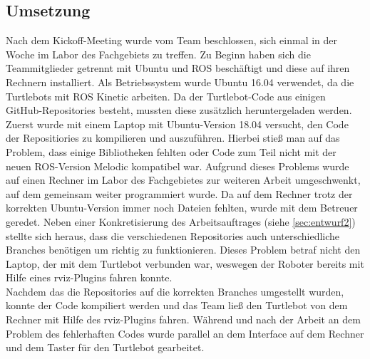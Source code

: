 \documentclass[a4paper,12pt,headsepline]{scrartcl}
\begin{document}
		
	\subsection{Umsetzung}
		Nach dem Kickoff-Meeting wurde vom Team beschlossen, sich einmal in der Woche im Labor des Fachgebiets zu treffen. Zu Beginn haben sich die Teammitglieder getrennt mit Ubuntu und ROS beschäftigt und diese auf ihren Rechnern installiert. Als Betriebssystem wurde Ubuntu 16.04 verwendet, da die Turtlebots mit ROS Kinetic arbeiten. Da der Turtlebot-Code aus einigen GitHub-Repositories besteht, mussten diese zusätzlich heruntergeladen werden.\\
		Zuerst wurde mit einem Laptop mit Ubuntu-Version 18.04 versucht, den Code der Repositiories zu kompilieren und auszuführen. Hierbei stieß man auf das Problem, dass einige Bibliotheken fehlten oder Code zum Teil nicht mit der neuen ROS-Version Melodic kompatibel war. Aufgrund dieses Problems wurde auf einen Rechner im Labor des Fachgebietes zur weiteren Arbeit umgeschwenkt, auf dem gemeinsam weiter programmiert wurde. Da auf dem Rechner trotz der korrekten Ubuntu-Version immer noch Dateien fehlten, wurde mit dem Betreuer geredet. Neben einer Konkretisierung des Arbeitsauftrages (siehe \cref{sec:entwurf2}) stellte sich heraus, dass die verschiedenen Repositories auch unterschiedliche Branches benötigen um richtig zu funktionieren. Dieses Problem betraf nicht den Laptop, der mit dem Turtlebot verbunden war, weswegen der Roboter bereits mit Hilfe eines rviz-Plugins fahren konnte.\\
		Nachdem das die Repositories auf die korrekten Branches umgestellt wurden, konnte der Code kompiliert werden und das Team ließ den Turtlebot von dem Rechner mit Hilfe des rviz-Plugins fahren. Während und nach der Arbeit an dem Problem des fehlerhaften Codes wurde parallel an dem Interface auf dem Rechner und dem Taster für den Turtlebot gearbeitet.
%
\end{document}
